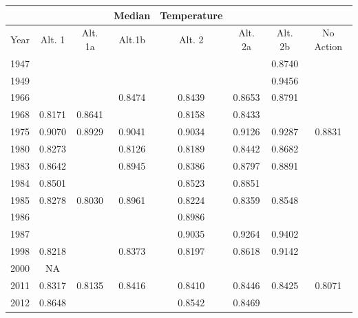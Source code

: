 \documentclass[12pt]{article}
\begin{document}
\begin{table}[h]
\begin{tabular}{cccccccc}		
\hline
&&& \textbf{Median} & \textbf{Temperature} &&&\\
\hline
Year  & Alt. 1 & Alt. 1a & Alt.1b & Alt. 2 & Alt. 2a & Alt. 2b & No Action\\ 
1947	& & & & & & 0.8740 &\\
1949	& & & & & & 0.9456 &\\
1966	& & & 0.8474 & 0.8439 & 0.8653 & 0.8791 &\\
1968	& 0.8171 & 0.8641	& & 0.8158 & 0.8433 & & \\	
1975	& 0.9070 & 0.8929	& 0.9041 & 0.9034 &  0.9126 & 0.9287 & 0.8831\\
1980	& 0.8273 & & 0.8126 & 0.8189 & 0.8442 & 0.8682 & \\	
1983	& 0.8642 & & 0.8945 & 0.8386& 0.8797 & 0.8891 &\\	
1984	& 0.8501 & & & 0.8523 & 0.8851 & & \\	
1985	& 0.8278 & 0.8030 & 0.8961 & 0.8224 & 0.8359 & 0.8548 & \\	
1986	& & & & 0.8986 & & & \\
1987	& & & & 0.9035 & 0.9264 & 0.9402 & \\
1998	& 0.8218 & & 0.8373 & 0.8197 & 0.8618 & 0.9142 & \\	
2000	& NA & & & & & & \\	
2011	& 0.8317 & 0.8135 & 0.8416 & 0.8410 & 0.8446 & 0.8425 & 0.8071\\
2012	& 0.8648 & & & 0.8542 & 0.8469 & &\\	
\hline
\end{tabular}
\end{table}

\newpage
\end{document}

